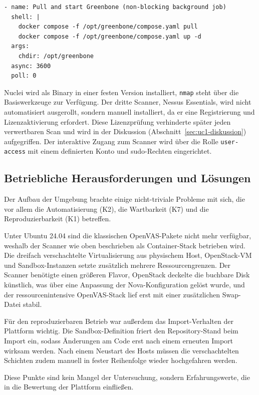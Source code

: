 \begin{verbatim}
- name: Pull and start Greenbone (non-blocking background job)
  shell: |
    docker compose -f /opt/greenbone/compose.yaml pull
    docker compose -f /opt/greenbone/compose.yaml up -d
  args:
    chdir: /opt/greenbone
  async: 3600
  poll: 0
\end{verbatim}

Nuclei wird als Binary in einer festen Version installiert, \texttt{nmap} steht über die
Basiswerkzeuge zur Verfügung. Der dritte Scanner, Nessus Essentials, wird nicht automatisiert
ausgerollt, sondern manuell installiert, da er eine Registrierung und Lizenzaktivierung erfordert.
Diese Lizenzprüfung verhinderte später jeden verwertbaren Scan und wird in der Diskussion
(Abschnitt~\ref{sec:uc1-diskussion}) aufgegriffen. Der interaktive Zugang
zum Scanner wird über die Rolle \texttt{user-access} mit einem definierten Konto und sudo-Rechten
eingerichtet.

\subsection{Betriebliche Herausforderungen und Lösungen}
\label{subsec:uc1-betrieb}

Der Aufbau der Umgebung brachte einige nicht-triviale Probleme mit sich, die vor allem die
Automatisierung (K2), die Wartbarkeit (K7) und die Reproduzierbarkeit (K1) betreffen.

Unter Ubuntu 24.04 sind die klassischen OpenVAS-Pakete nicht mehr verfügbar, weshalb der Scanner wie
oben beschrieben als Container-Stack betrieben wird. Die dreifach verschachtelte Virtualisierung aus
physischem Host, OpenStack-VM und Sandbox-Instanzen setzte zusätzlich mehrere Ressourcengrenzen. Der
Scanner benötigte einen größeren Flavor, OpenStack deckelte die buchbare Disk künstlich, was über
eine Anpassung der Nova-Konfiguration gelöst wurde, und der ressourcenintensive OpenVAS-Stack lief
erst mit einer zusätzlichen Swap-Datei stabil.

Für den reproduzierbaren Betrieb war außerdem das Import-Verhalten der Plattform wichtig. Die
Sandbox-Definition friert den Repository-Stand beim Import ein, sodass Änderungen am Code erst nach
einem erneuten Import wirksam werden. Nach einem Neustart des Hosts müssen die verschachtelten
Schichten zudem manuell in fester Reihenfolge wieder hochgefahren werden.

Diese Punkte sind kein Mangel der Untersuchung, sondern Erfahrungswerte, die in die Bewertung der
Plattform einfließen.


